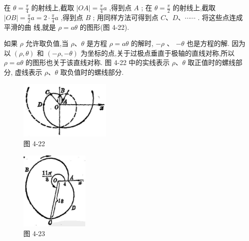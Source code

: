 \documentclass[lang=cn,newtx,10pt,scheme=chinese]{elegantbook}
\begin{document}
\begin{center}
\end{center}

在 \(\theta = \frac{\pi }{4}\) 的射线上,截取 \(\left| {OA}\right| = \frac{\pi }{4}a\) ,得到点 \(A\) ; 在 \(\theta = \frac{\pi }{2}\) 的射线上,截取 \(\left| {OB}\right| = \frac{\pi }{2}a = 2 \cdot \frac{\pi }{4}a\) ,得到点 \(B\) ; 用同样方法可得到点 \(C\text{、}D\text{、}\cdots \cdots\) . 将这些点连成平滑的曲 线,就是 \(\rho = {a\theta }\) 的图形(图 4-22).

如果 \(\rho\) 允许取负值,当 \(\rho \text{、}\theta\) 是方程 \(\rho = {a\theta }\) 的解时, \(- \rho\) 、 \(- \theta\) 也是方程的解. 因为以 \(\left( {\rho ,\theta }\right)\) 和 \(\left( {-\rho , - \theta }\right)\) 为坐标的点,关于过极点垂直于极轴的直线对称,所以 \(\rho = {a\theta }\) 的图形也关于该直线对称. 图 4-22 中的实线表示 \(\rho \text{、}\theta\) 取正值时的螺线部分, 虚线表示 \(\rho \text{、}\theta\) 取负值时的螺线部分.

\begin{figure}[h]
  \centering
  \includegraphics[max width=0.4\textwidth]{images/01912cc2-ffb6-728e-9ae7-b113ff05c64b_185_467039.jpg}
  \caption{图 4-22}
\end{figure}



\begin{figure}[h]
  \centering
  \includegraphics[max width=0.3\textwidth]{images/01912cc2-ffb6-728e-9ae7-b113ff05c64b_185_356725.jpg}
  \caption{图 4-23}
\end{figure}
\end{document}
